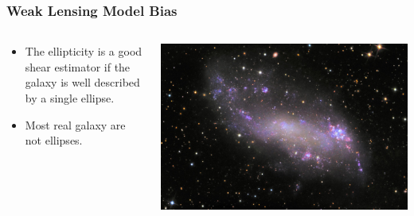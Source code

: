 \documentclass{beamer}
\begin{document}
\frame
{
    \frametitle{Weak Lensing Model Bias}

 
    \begin{columns}
        \begin{column}{0.5\textwidth}    


            \begin{itemize}

                \item The ellipticity is a good shear estimator if the galaxy is
                    well described by a single ellipse.

                \item Most real galaxy are not ellipses. 

            \end{itemize}
        \end{column}

        \begin{column}{0.5\textwidth}
            \begin{center}
                \includegraphics[width=\textwidth]{IC-2574.jpg}
                \newline
            \end{center}
        \end{column}

    \end{columns}

}
\end{document}
